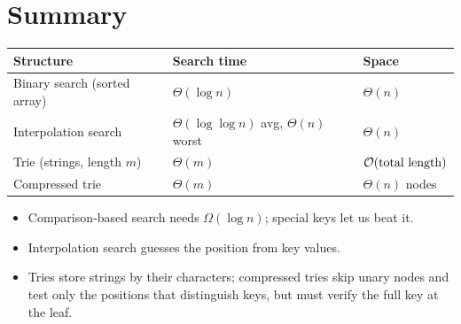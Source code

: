 \section{Summary}
\begin{center}
\begin{tabular}{lll}
\toprule
Structure & Search time & Space\\
\midrule
Binary search (sorted array) & $\Theta(\log n)$ & $\Theta(n)$\\
Interpolation search & $\Theta(\log\log n)$ avg, $\Theta(n)$ worst & $\Theta(n)$\\
Trie (strings, length $m$) & $\Theta(m)$ & $\mathcal{O}(\text{total length})$\\
Compressed trie & $\Theta(m)$ & $\Theta(n)$ nodes\\
\bottomrule
\end{tabular}
\end{center}
\begin{itemize}
  \item Comparison-based search needs $\Omega(\log n)$; special keys let us beat it.
  \item Interpolation search guesses the position from key values.
  \item Tries store strings by their characters; compressed tries skip unary
        nodes and test only the positions that distinguish keys, but must verify
        the full key at the leaf.
\end{itemize}
